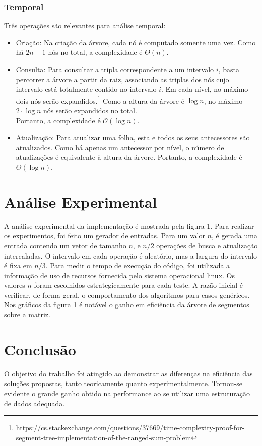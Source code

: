 \documentclass{article}
\begin{document}
\subsubsection{Temporal}
Três operações são relevantes para análise temporal:
\vspace{-5pt}
\begin{itemize}
  \item \uline{Criação}: Na criação da árvore, cada nó é computado somente uma vez. Como há $2n - 1$ nós no total, a complexidade é $\Theta(n)$.

  \item \uline{Consulta}: Para consultar a tripla correspondente a um intervalo $i$, basta percorrer a árvore a partir da raiz, associando as triplas dos nós cujo intervalo está totalmente contido no intervalo $i$. Em cada nível, no máximo dois nós serão expandidos.\footnote{\label{link2}https://cs.stackexchange.com/questions/37669/time-complexity-proof-for-segment-tree-implementation-of-the-ranged-sum-problem} Como a altura da árvore é $\log n$, no máximo $2 \cdot \log n$ nós serão expandidos no total. \\ Portanto, a complexidade é $\mathcal{O}(\log n)$.
  
  \item \uline{Atualização}: Para atualizar uma folha, esta e todos os seus antecessores são atualizados. Como há apenas um antecessor por nível, o número de atualizações é equivalente à altura da árvore. Portanto, a complexidade é $\Theta(\log n)$.
\end{itemize}


\section{Análise Experimental}
A análise experimental da implementação é mostrada pela figura 1. Para realizar os experimentos, foi feito um gerador de entradas. Para um valor $n$, é gerada uma entrada contendo um vetor de tamanho $n$, e $n / 2$ operações de busca e atualização intercaladas. O intervalo em cada operação é aleatório, mas a largura do intervalo é fixa em $n / 3$. Para medir o tempo de execução do código, foi utilizada a informação de uso de recursos fornecida pelo sistema operacional linux. Os valores $n$ foram escolhidos estrategicamente para cada teste. A razão inicial é verificar, de forma geral, o comportamento dos algoritmos para casos genéricos.
\vspace{-10pt}
Nos gráficos da figura 1 é notável o ganho em eficiência da árvore de segmentos sobre a matriz.

\section{Conclusão}
O objetivo do trabalho foi atingido ao demonstrar as diferenças na eficiência das soluções propostas, tanto teoricamente quanto experimentalmente. Tornou-se evidente o grande ganho obtido na performance ao se utilizar uma estruturação de dados adequada.
\end{document}
